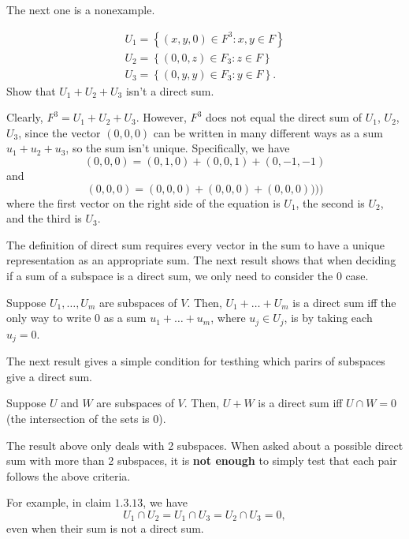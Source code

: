 The next one is a nonexample.
\begin{claim}[Nonexample]
  \begin{gather*}
    U_{1} = \left\{(x, y, 0) \in F^{3} : x, y \in F\right\} \\
    U_{2} = \left\{(0, 0, z) \in F_{3} : z \in F\right\} \\
    U_{3} = \left\{(0, y, y) \in F_{3} : y \in F\right\}.
  \end{gather*}
  Show that $U_{1} + U_{2} + U_{3}$ isn't a direct sum.
\end{claim}

\begin{soln}
  Clearly, $F^{3} = U_{1} + U_{2} + U_{3}$.
  However, $F^{3}$ does not equal the direct sum of $U_{1}$, $U_{2}$, $U_{3}$, 
  since the vector $(0, 0, 0)$ can be written in many different ways as a sum $u_{1} + u_{2} + u_{3}$, so the sum isn't unique.
  Specifically, we have
  \begin{equation*}
    (0, 0, 0) = (0, 1, 0) + (0, 0, 1) + (0, -1, -1)
  \end{equation*}
  and 
  \begin{equation*}
    (0, 0, 0) = (0, 0, 0) + (0, 0, 0) + (0, 0, 0))))
  \end{equation*}
  where the first vector on the right side of the equation is $U_{1}$, the second is $U_{2}$, and the third is $U_{3}$.
\end{soln}

The definition of direct sum requires every vector in the sum to have a unique representation as an appropriate sum.
The next result shows that when deciding if a sum of a subspace is a direct sum, we only need to consider the $0$ case.

\begin{theorem}
  Suppose $U_{1}, \dots, U_{m}$ are subspaces of $V$. 
  Then, $U_{1} + \dots + U_{m}$ is a direct sum iff the only way to write $0$ as a sum $u_{1} + \dots + u_{m}$,
  where $u_{j} \in U_{j}$, is by taking each $u_{j} = 0$.
\end{theorem}

The next result gives a simple condition for testhing which parirs of subspaces give a direct sum.

\begin{theorem}
  Suppose $U$ and $W$ are subspaces of $V$.
  Then, $U + W$ is a direct sum iff $U \cap W = {0}$ (the intersection of the sets is $0$).
\end{theorem}

The result above only deals with 2 subspaces. 
When asked about a possible direct sum with more than 2 subspaces, it is \textbf{not enough} to simply test that each pair follows the above criteria.

For example, in claim $1.3.13$, we have 
\begin{equation*}
  U_{1} \cap U_{2} = U_{1} \cap U_{3} = U_{2} \cap U_{3} = 0,
\end{equation*}
even when their sum is not a direct sum.





